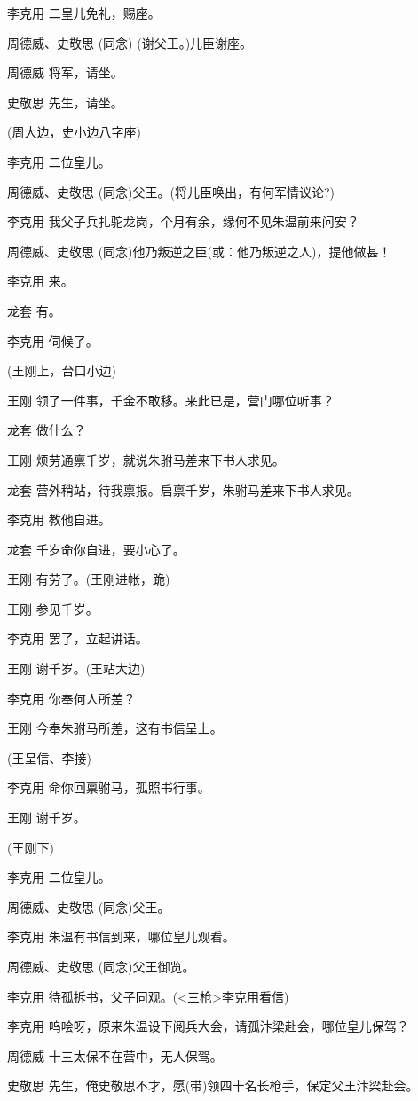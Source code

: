 李克用 二皇儿免礼，赐座。

周德威、史敬思 (同念) (谢父王。)儿臣谢座。

周德威 将军，请坐。

史敬思 先生，请坐。

(周大边，史小边八字座)

李克用 二位皇儿。

周德威、史敬思 (同念)父王。(将儿臣唤出，有何军情议论?)

李克用 我父子兵扎驼龙岗，个月有余，缘何不见朱温前来问安？

周德威、史敬思 (同念)他乃叛逆之臣(或：他乃叛逆之人)，提他做甚！

李克用 来。

龙套 有。

李克用 伺候了。

(王刚上，台口小边)

王刚 领了一件事，千金不敢移。来此已是，营门哪位听事？

龙套 做什么？

王刚 烦劳通禀千岁，就说朱驸马差来下书人求见。

龙套 营外稍站，待我禀报。启禀千岁，朱驸马差来下书人求见。

李克用 教他自进。

龙套 千岁命你自进，要小心了。

王刚 有劳了。(王刚进帐，跪)

王刚 参见千岁。

李克用 罢了，立起讲话。

王刚 谢千岁。(王站大边)

李克用 你奉何人所差？

王刚 今奉朱驸马所差，这有书信呈上。

(王呈信、李接)

李克用 命你回禀驸马，孤照书行事。

王刚 谢千岁。

(王刚下)

李克用 二位皇儿。

周德威、史敬思 (同念)父王。

李克用 朱温有书信到来，哪位皇儿观看。

周德威、史敬思 (同念)父王御览。

李克用 待孤拆书，父子同观。(\textless{}三枪\textgreater{}李克用看信)

李克用 呜哙呀，原来朱温设下阅兵大会，请孤汴梁赴会，哪位皇儿保驾？

周德威 十三太保不在营中，无人保驾。

史敬思 先生，俺史敬思不才，愿(带)领四十名长枪手，保定父王汴梁赴会。

